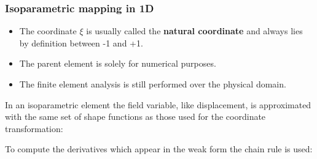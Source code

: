 \documentclass[notes]{beamer}
\begin{document}
\begin{frame}
\frametitle{Isoparametric mapping in 1D}

\begin{itemize}
	\item The coordinate $\xi$ is usually called the \textbf{natural coordinate} and always lies by definition between -1 and +1.
	
	\item The parent element is solely for numerical purposes. 
	
	\item The finite element analysis is still performed over the physical domain.
\end{itemize}


In an isoparametric element the field variable, like displacement, is approximated with the
same set of shape functions as those used for the coordinate transformation:


To compute the derivatives which appear in the weak form the chain rule is used:

\end{frame}
\end{document}
